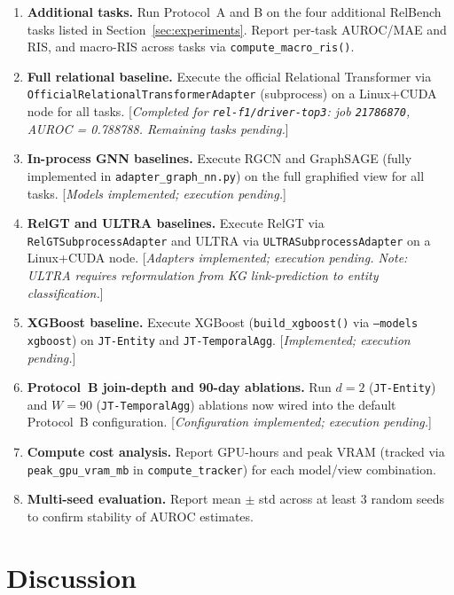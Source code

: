 \documentclass[11pt]{article}
\newcommand{\viewname}[1]{\texttt{#1}}
\begin{document}
\begin{enumerate}
  \item \textbf{Additional tasks.} Run Protocol~A and B on the four
        additional RelBench tasks listed in Section~\ref{sec:experiments}.
        Report per-task AUROC/MAE and RIS, and macro-RIS across tasks
        via \texttt{compute\_macro\_ris()}.
  \item \textbf{Full relational baseline.} Execute the official
        Relational Transformer via \texttt{OfficialRelationalTransformerAdapter}
        (subprocess) on a Linux+CUDA node for all tasks.
        [\emph{Completed for \texttt{rel-f1/driver-top3}:
        job \texttt{21786870}, AUROC = 0.788788.
        Remaining tasks pending.}]
  \item \textbf{In-process GNN baselines.} Execute RGCN and GraphSAGE
        (fully implemented in \texttt{adapter\_graph\_nn.py}) on the
        full graphified view for all tasks.
        [\emph{Models implemented; execution pending.}]
  \item \textbf{RelGT and ULTRA baselines.} Execute RelGT via
        \texttt{RelGTSubprocessAdapter} and ULTRA via
        \texttt{ULTRASubprocessAdapter} on a Linux+CUDA node.
        [\emph{Adapters implemented; execution pending. Note: ULTRA
        requires reformulation from KG link-prediction to entity
        classification.}]
  \item \textbf{XGBoost baseline.} Execute XGBoost
        (\texttt{build\_xgboost()} via \texttt{--models xgboost})
        on \viewname{JT-Entity} and \viewname{JT-TemporalAgg}.
        [\emph{Implemented; execution pending.}]
  \item \textbf{Protocol~B join-depth and 90-day ablations.}
        Run $d=2$ (\viewname{JT-Entity}) and $W=90$ (\viewname{JT-TemporalAgg})
        ablations now wired into the default Protocol~B configuration.
        [\emph{Configuration implemented; execution pending.}]
  \item \textbf{Compute cost analysis.} Report GPU-hours and peak VRAM
        (tracked via \texttt{peak\_gpu\_vram\_mb} in \texttt{compute\_tracker})
        for each model/view combination.
  \item \textbf{Multi-seed evaluation.} Report mean $\pm$ std across
        at least 3 random seeds to confirm stability of AUROC
        estimates.
\end{enumerate}

\section{Discussion}
\label{sec:discussion}
\end{document}
